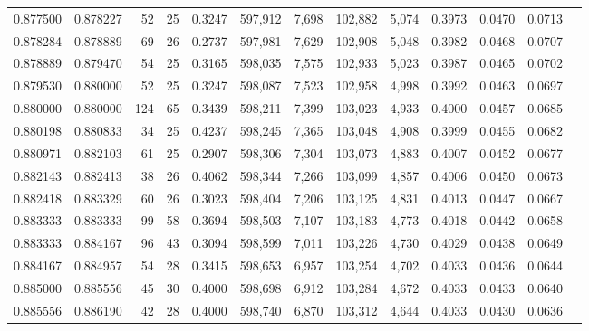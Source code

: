 \begin{tabular}{rrrrrrrrrrrrr}
0.877500 & 0.878227 &     52 &    25 &                                     0.3247 & 597,912 &   7,698 & 102,882 &   5,074 & 0.3973 & 0.0470 & 0.0713 \\
0.878284 & 0.878889 &     69 &    26 &                                     0.2737 & 597,981 &   7,629 & 102,908 &   5,048 & 0.3982 & 0.0468 & 0.0707 \\
0.878889 & 0.879470 &     54 &    25 &                                     0.3165 & 598,035 &   7,575 & 102,933 &   5,023 & 0.3987 & 0.0465 & 0.0702 \\
0.879530 & 0.880000 &     52 &    25 &                                     0.3247 & 598,087 &   7,523 & 102,958 &   4,998 & 0.3992 & 0.0463 & 0.0697 \\
0.880000 & 0.880000 &    124 &    65 &                                     0.3439 & 598,211 &   7,399 & 103,023 &   4,933 & 0.4000 & 0.0457 & 0.0685 \\
0.880198 & 0.880833 &     34 &    25 &                                     0.4237 & 598,245 &   7,365 & 103,048 &   4,908 & 0.3999 & 0.0455 & 0.0682 \\
0.880971 & 0.882103 &     61 &    25 &                                     0.2907 & 598,306 &   7,304 & 103,073 &   4,883 & 0.4007 & 0.0452 & 0.0677 \\
0.882143 & 0.882413 &     38 &    26 &                                     0.4062 & 598,344 &   7,266 & 103,099 &   4,857 & 0.4006 & 0.0450 & 0.0673 \\
0.882418 & 0.883329 &     60 &    26 &                                     0.3023 & 598,404 &   7,206 & 103,125 &   4,831 & 0.4013 & 0.0447 & 0.0667 \\
0.883333 & 0.883333 &     99 &    58 &                                     0.3694 & 598,503 &   7,107 & 103,183 &   4,773 & 0.4018 & 0.0442 & 0.0658 \\
0.883333 & 0.884167 &     96 &    43 &                                     0.3094 & 598,599 &   7,011 & 103,226 &   4,730 & 0.4029 & 0.0438 & 0.0649 \\
0.884167 & 0.884957 &     54 &    28 &                                     0.3415 & 598,653 &   6,957 & 103,254 &   4,702 & 0.4033 & 0.0436 & 0.0644 \\
0.885000 & 0.885556 &     45 &    30 &                                     0.4000 & 598,698 &   6,912 & 103,284 &   4,672 & 0.4033 & 0.0433 & 0.0640 \\
0.885556 & 0.886190 &     42 &    28 &                                     0.4000 & 598,740 &   6,870 & 103,312 &   4,644 & 0.4033 & 0.0430 & 0.0636 \\

\end{tabular}
